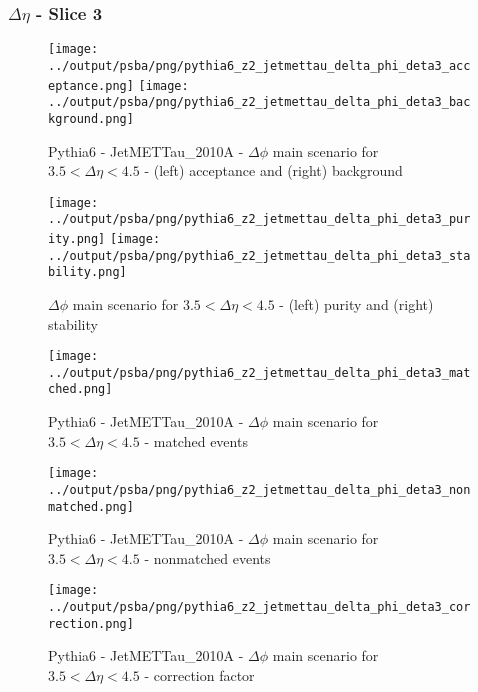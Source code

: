 \documentclass[11pt]{book}
\begin{document}
\clearpage
\subsubsection{$\Delta\eta$ - Slice 3}

\begin{figure}[ht]
\centering
\texttt{[image: ../output/psba/png/pythia6\_z2\_jetmettau\_delta\_phi\_deta3\_acceptance.png]}
\texttt{[image: ../output/psba/png/pythia6\_z2\_jetmettau\_delta\_phi\_deta3\_background.png]}
\caption{Pythia6 - JetMETTau\_2010A - $\Delta\phi$ main scenario for $3.5 < \Delta\eta < 4.5$ - (left) acceptance and (right) background}
\label{fig:p6_jetmettau_delta_phi_deta3_ab}
\end{figure}

\begin{figure}[ht]
\centering
\texttt{[image: ../output/psba/png/pythia6\_z2\_jetmettau\_delta\_phi\_deta3\_purity.png]}
\texttt{[image: ../output/psba/png/pythia6\_z2\_jetmettau\_delta\_phi\_deta3\_stability.png]}
\caption{$\Delta\phi$ main scenario for $3.5 < \Delta\eta < 4.5$ - (left) purity and (right) stability}
\label{fig:p6_jetmettau_delta_phi_deta3_ps}
\end{figure}

\begin{figure}[ht]
\centering
\texttt{[image: ../output/psba/png/pythia6\_z2\_jetmettau\_delta\_phi\_deta3\_matched.png]}
\caption{Pythia6 - JetMETTau\_2010A - $\Delta\phi$ main scenario for $3.5 < \Delta\eta < 4.5$ - matched events}
\label{fig:p6_jetmettau_delta_phi_deta3_matched}
\end{figure}

\begin{figure}[ht]
\centering
\texttt{[image: ../output/psba/png/pythia6\_z2\_jetmettau\_delta\_phi\_deta3\_nonmatched.png]}
\caption{Pythia6 - JetMETTau\_2010A - $\Delta\phi$ main scenario for $3.5 < \Delta\eta < 4.5$ - nonmatched events}
\label{fig:p6_jetmettau_delta_phi_deta3_nonmatched}
\end{figure}

\begin{figure}[ht]
\centering
\texttt{[image: ../output/psba/png/pythia6\_z2\_jetmettau\_delta\_phi\_deta3\_correction.png]}
\caption{Pythia6 - JetMETTau\_2010A - $\Delta\phi$ main scenario for $3.5 < \Delta\eta < 4.5$ - correction factor}
\label{fig:p6_jetmettau_delta_phi_deta3_correction}
\end{figure}
\end{document}

